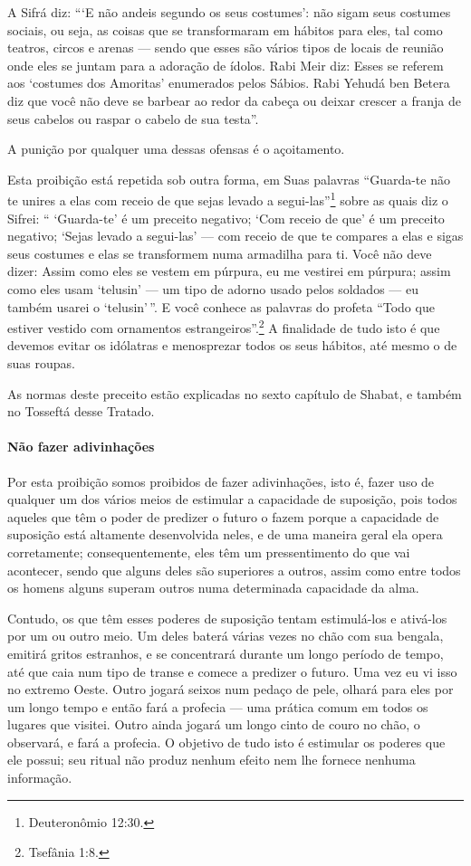 A Sifrá diz: ```E não andeis segundo os seus costumes': não sigam seus
costumes sociais, ou seja, as coisas que se transformaram em hábitos
para eles, tal como teatros, circos e arenas --- sendo que esses são
vários tipos de locais de reunião onde eles se juntam para a adoração de
ídolos. Rabi Meir diz: Esses se referem aos `costumes dos Amoritas'
enumerados pelos Sábios. Rabi Yehudá ben Betera diz que você não deve se
barbear ao redor da cabeça ou deixar crescer a franja de seus cabelos ou
raspar o cabelo de sua testa''.

A punição por qualquer uma dessas ofensas é o açoitamento.

Esta proibição está repetida sob outra forma, em Suas palavras
``Guarda-te não te unires a elas com receio de que sejas levado a
segui-las''\footnote{Deuteronômio 12:30.} sobre as quais diz o Sifrei: ``
`Guarda-te' é um preceito negativo; `Com receio de que' é um preceito
negativo; `Sejas levado a segui-las' --- com receio de que te compares a
elas e sigas seus costumes e elas se transformem numa armadilha para ti.
Você não deve dizer: Assim como eles se vestem em púrpura, eu me
vestirei em púrpura; assim como eles usam `telusin' --- um tipo de
adorno usado pelos soldados --- eu também usarei o `telusin'\,''. E você
conhece as palavras do profeta ``Todo que estiver vestido com ornamentos
estrangeiros''.\footnote{Tsefânia 1:8.} A finalidade de tudo isto é que
devemos evitar os idólatras e menosprezar todos os seus hábitos, até
mesmo o de suas roupas.

As normas deste preceito estão explicadas no sexto capítulo de Shabat, e
também no Tosseftá desse Tratado.

\paragraph{Não fazer adivinhações}

Por esta proibição somos proibidos de fazer adivinhações, isto é, fazer
uso de qualquer um dos vários meios de estimular a capacidade de
suposição, pois todos aqueles que têm o poder de predizer o futuro o
fazem porque a capacidade de suposição está altamente desenvolvida
neles, e de uma maneira geral ela opera corretamente; consequentemente,
eles têm um pressentimento do que vai acontecer, sendo que alguns deles
são superiores a outros, assim como entre todos os homens alguns superam
outros numa determinada capacidade da alma.

Contudo, os que têm esses poderes de suposição tentam estimulá-los e
ativá-los por um ou outro meio. Um deles baterá várias vezes no chão com
sua bengala, emitirá gritos estranhos, e se concentrará durante um longo
período de tempo, até que caia num tipo de transe e comece a predizer o
futuro. Uma vez eu vi isso no extremo Oeste. Outro jogará seixos num
pedaço de pele, olhará para eles por um longo tempo e então fará a
profecia --- uma prática comum em todos os lugares que visitei. Outro
ainda jogará um longo cinto de couro no chão, o observará, e fará a
profecia. O objetivo de tudo isto é estimular os poderes que ele
possui; seu ritual não produz nenhum efeito nem lhe fornece nenhuma
informação.


